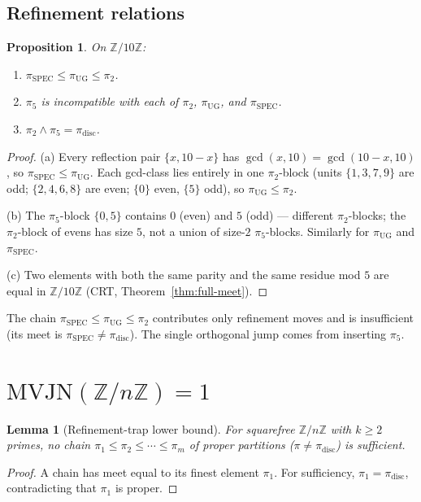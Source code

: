 \documentclass[11pt,reqno]{amsart}
\theoremstyle{plain}
\newtheorem{lemma}[theorem]{Lemma}
\newtheorem{proposition}[theorem]{Proposition}
\theoremstyle{definition}
\newcommand{\Z}{\mathbb{Z}}
\newcommand{\Zn}{\Z/n\Z}
\newcommand{\meet}{\wedge}
\newcommand{\disc}{\mathrm{disc}}
\newcommand{\SPEC}{\mathrm{SPEC}}
\newcommand{\UG}{\mathrm{UG}}
\newcommand{\MVJN}{\mathrm{MVJN}}
\begin{document}
\subsection{Refinement relations}

\begin{proposition} \label{prop:n10-lattice}
On $\Z/10\Z$:
\begin{enumerate}[label=\textup{(\alph*)}]
\item $\pi_{\SPEC} \leq \pi_{\UG} \leq \pi_2$.
\item $\pi_5$ is incompatible with each of $\pi_2$, $\pi_{\UG}$, and $\pi_{\SPEC}$.
\item $\pi_2 \meet \pi_5 = \pi_{\disc}$.
\end{enumerate}
\end{proposition}

\begin{proof}
(a) Every reflection pair $\{x, 10 - x\}$ has $\gcd(x, 10) = \gcd(10 - x, 10)$, so $\pi_{\SPEC} \leq \pi_{\UG}$. Each gcd-class lies entirely in one $\pi_2$-block (units $\{1, 3, 7, 9\}$ are odd; $\{2, 4, 6, 8\}$ are even; $\{0\}$ even, $\{5\}$ odd), so $\pi_{\UG} \leq \pi_2$.

(b) The $\pi_5$-block $\{0, 5\}$ contains $0$ (even) and $5$ (odd) --- different $\pi_2$-blocks; the $\pi_2$-block of evens has size $5$, not a union of size-$2$ $\pi_5$-blocks. Similarly for $\pi_{\UG}$ and $\pi_{\SPEC}$.

(c) Two elements with both the same parity and the same residue mod $5$ are equal in $\Z/10\Z$ (CRT, Theorem~\ref{thm:full-meet}).
\end{proof}

The chain $\pi_{\SPEC} \leq \pi_{\UG} \leq \pi_2$ contributes only refinement moves and is insufficient (its meet is $\pi_{\SPEC} \neq \pi_{\disc}$). The single orthogonal jump comes from inserting $\pi_5$.

\section{$\MVJN(\Zn) = 1$}

\begin{lemma}[Refinement-trap lower bound] \label{lem:refinement-trap}
For squarefree $\Zn$ with $k \geq 2$ primes, no chain $\pi_1 \leq \pi_2 \leq \cdots \leq \pi_m$ of proper partitions ($\pi \neq \pi_{\disc}$) is sufficient.
\end{lemma}

\begin{proof}
A chain has meet equal to its finest element $\pi_1$. For sufficiency, $\pi_1 = \pi_{\disc}$, contradicting that $\pi_1$ is proper.
\end{proof}
\end{document}
